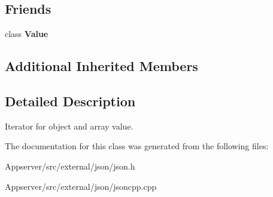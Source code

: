 \subsection*{Friends}
\begin{DoxyCompactItemize}
\item 
class {\bfseries Value}\hypertarget{classJson_1_1ValueIterator_aeceedf6e1a7d48a588516ce2b1983d6f}{}\label{classJson_1_1ValueIterator_aeceedf6e1a7d48a588516ce2b1983d6f}

\end{DoxyCompactItemize}
\subsection*{Additional Inherited Members}


\subsection{Detailed Description}
Iterator for object and array value. 

The documentation for this class was generated from the following files\+:\begin{DoxyCompactItemize}
\item 
Appserver/src/external/json/json.\+h\item 
Appserver/src/external/json/jsoncpp.\+cpp\end{DoxyCompactItemize}
